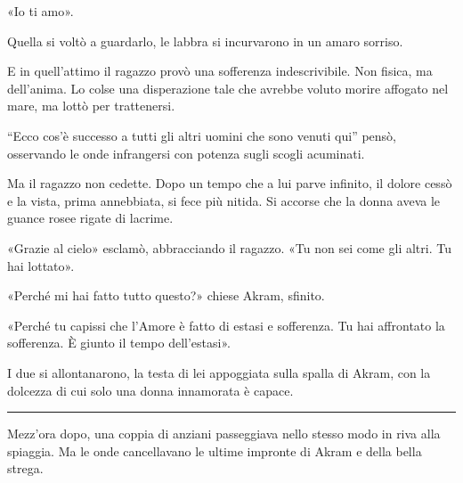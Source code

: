 \documentclass[a4paper,11pt,oneside,openright,final]{memoir}
\begin{document}
«Io ti amo».

Quella si voltò a guardarlo, le labbra si incurvarono in un amaro sorriso.

E in quell'attimo il ragazzo provò una sofferenza indescrivibile. Non fisica,
ma dell'anima. Lo colse una disperazione tale che avrebbe voluto morire affogato
nel mare, ma lottò per trattenersi.

``Ecco cos'è successo a tutti gli altri uomini che sono venuti qui'' pensò,
osservando le onde infrangersi con potenza sugli scogli acuminati.

Ma il ragazzo non cedette. Dopo un tempo che a lui parve infinito, il dolore
cessò e la vista, prima annebbiata, si fece più nitida. Si accorse che la
donna aveva le guance rosee rigate di lacrime.

«Grazie al cielo» esclamò, abbracciando il ragazzo. «Tu non sei come gli
altri. Tu hai lottato».

«Perché mi hai fatto tutto questo?» chiese Akram, sfinito.

«Perché tu capissi che l'Amore è fatto di estasi e sofferenza. Tu hai
affrontato la sofferenza. È giunto il tempo dell'estasi».

I due si allontanarono, la testa di lei appoggiata sulla spalla di Akram, con la
dolcezza di cui solo una donna innamorata è capace.

\plainbreak{1}

Mezz'ora dopo, una coppia di anziani passeggiava nello stesso modo in riva alla
spiaggia. Ma le onde cancellavano le ultime impronte di Akram e della bella
strega.
\end{document}
